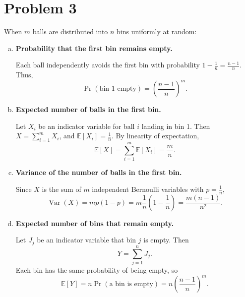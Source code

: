 \section*{Problem 3}

When $m$ balls are distributed into $n$ bins uniformly at random:

\begin{enumerate}[(a)]
\item \textbf{Probability that the first bin remains empty.}

Each ball independently avoids the first bin with probability $1 - \frac{1}{n} = \frac{n-1}{n}$.  
Thus,
\[
\Pr(\text{bin 1 empty}) = \left( \frac{n-1}{n} \right)^m.
\]

\item \textbf{Expected number of balls in the first bin.}

Let $X_i$ be an indicator variable for ball $i$ landing in bin 1.
Then $X = \sum_{i=1}^{m} X_i$, and $\mathbb{E}[X_i] = \frac{1}{n}$.
By linearity of expectation,
\[
\mathbb{E}[X] = \sum_{i=1}^{m} \mathbb{E}[X_i] = \frac{m}{n}.
\]

\item \textbf{Variance of the number of balls in the first bin.}

Since $X$ is the sum of $m$ independent Bernoulli variables with $p = \frac{1}{n}$,
\[
\operatorname{Var}(X) = m p (1 - p) = m \frac{1}{n} \left(1 - \frac{1}{n}\right)
= \frac{m(n - 1)}{n^2}.
\]

\item \textbf{Expected number of bins that remain empty.}

Let $J_j$ be an indicator variable that bin $j$ is empty. Then
\[
Y = \sum_{j=1}^{n} J_j.
\]
Each bin has the same probability of being empty, so
\[
\mathbb{E}[Y] = n \Pr(\text{a bin is empty}) = n \left(\frac{n - 1}{n}\right)^m.
\]
\end{enumerate}

